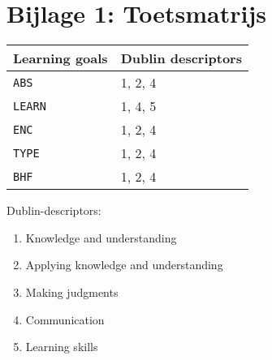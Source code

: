 \section*{Bijlage 1: Toetsmatrijs}
	\begin{tabular}{|p{2cm}|p{4cm}|}
		\hline
		Learning goals & Dublin descriptors \\
		\hline
        \texttt{ABS} & 1, 2, 4\\
        \hline
        \texttt{LEARN}& 1, 4, 5\\
        \hline
        \texttt{ENC} & 1, 2, 4\\
        \hline
        \texttt{TYPE} & 1, 2, 4\\
        \hline
        \texttt{BHF} & 1, 2, 4\\
        \hline
	\end{tabular}
	
	\vspace{1cm}

	Dublin-descriptors:
	\begin{enumerate}
		\item Knowledge and understanding
		\item Applying knowledge and understanding
		\item Making judgments
		\item Communication
		\item Learning skills
	\end{enumerate}

